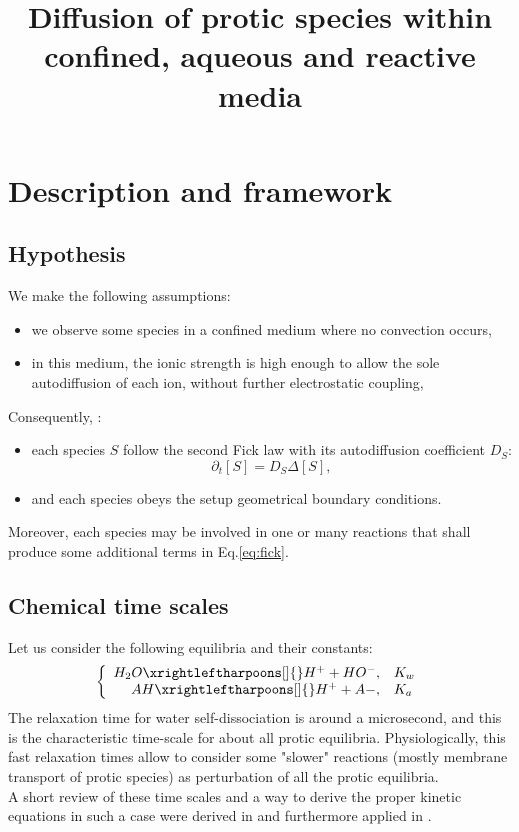 \documentclass[aps,11pt]{revtex4}
\begin{document}
\title{Diffusion of protic species within confined, aqueous and reactive media}
\maketitle
	
\section{Description and framework}	

\subsection{Hypothesis}
 
We make the following assumptions:
\begin{itemize}
\item we observe some species in a confined medium where no convection occurs,
\item in this medium, the ionic strength is high enough to allow the sole autodiffusion of each ion, without further electrostatic coupling,
\end{itemize}


Consequently, :
\begin{itemize}
\item each species $S$ follow the second Fick law with its autodiffusion coefficient $D_S$:
\begin{equation}
\label{eq:fick}
	\partial_t [S] = D_S \Delta [S],
\end{equation}

\item and each species obeys the setup geometrical boundary conditions.
\end{itemize}

Moreover, each species may be involved in one or many reactions that shall produce some additional terms in Eq.\eqref{eq:fick}.

\subsection{Chemical time scales}

Let us consider the following equilibria and their constants:
\begin{equation}
\label{eqs}
\left\lbrace
\begin{array}{rl}
H_2O \xrightleftharpoons[]{} H^+ + HO^-, &K_w \\
AH  \xrightleftharpoons[]{} H^+ + A-, & K_a\\
\end{array}
\right.
\end{equation}
The relaxation time for water self-dissociation is around a microsecond, and this is the characteristic time-scale
for about all protic equilibria. Physiologically, this fast relaxation times allow to consider some "slower" reactions (mostly membrane transport of protic species) as perturbation of all the protic equilibria.\\
A short review of these time scales and a way to derive the proper kinetic equations in such a case were derived in \cite{PLOS} and furthermore applied in \cite{BBA}.\\
\end{document}
